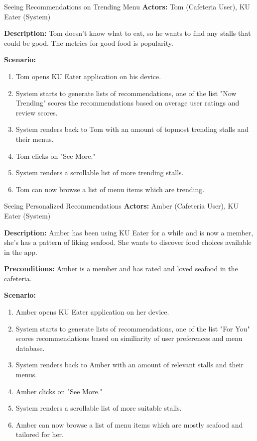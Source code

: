 \begin{usecase}{Seeing Recommendations on Trending Menu}
    \textbf{Actors:} Tom (Cafeteria User), KU Eater (System)
    
    \textbf{Description:} Tom doesn't know what to eat, so he wants to find any stalls that could be good. The metrics
    for good food is popularity.

    \textbf{Scenario:}

    \begin{enumerate}[leftmargin=80pt]
        \item Tom opens KU Eater application on his device.
        \item System starts to generate lists of recommendations, one of the list "Now Trending" scores the recommendations
        based on average user ratings and review scores.
        \item System renders back to Tom with an amount of topmost trending stalls and their menus.
        \item Tom clicks on "See More."
        \item System renders a scrollable list of more trending stalls.
        \item Tom can now browse a list of menu items which are trending.
    \end{enumerate}
\end{usecase}

\begin{usecase}{Seeing Personalized Recommendations}
    \textbf{Actors:} Amber (Cafeteria User), KU Eater (System)
    
    \textbf{Description:} Amber has been using KU Eater for a while and is now a member, she's has a pattern of liking seafood.
    She wants to discover food choices available in the app.

    \textbf{Preconditions:} Amber is a member and has rated and loved seafood in the cafeteria.

    \textbf{Scenario:}

    \begin{enumerate}[leftmargin=80pt]
        \item Amber opens KU Eater application on her device.
        \item System starts to generate lists of recommendations, one of the list "For You" scores recommendations
        based on similiarity of user preferences and menu database.
        \item System renders back to Amber with an amount of relevant stalls and their menus.
        \item Amber clicks on "See More."
        \item System renders a scrollable list of more suitable stalls.
        \item Amber can now browse a list of menu items which are mostly seafood and tailored for her.
    \end{enumerate}
\end{usecase}

